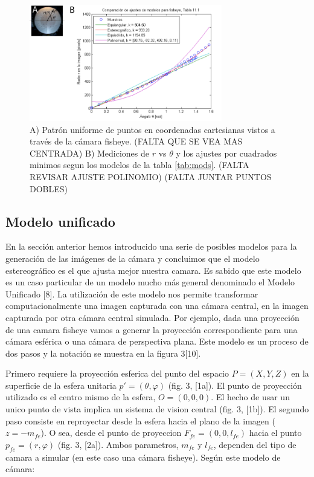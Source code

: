 \documentclass[12pt,a4paper]{article}
\begin{document}
\begin{figure}[!h]
  \centering
  \includegraphics[width=0.75\textwidth]{ajuste.png}
  \caption{A) Patrón uniforme de puntos en coordenadas cartesianas vistos a través de la cámara fisheye. (FALTA QUE SE VEA MAS CENTRADA) B) Mediciones de $r$ vs $\theta$ y los ajustes por cuadrados minimos segun los modelos  de la tabla \ref{tab:mods}. (FALTA REVISAR AJUSTE POLINOMIO) (FALTA JUNTAR PUNTOS DOBLES)}
  \label{fig:ajuste}
\end{figure}


\subsection{Modelo unificado}

En la sección anterior hemos introducido una serie de posibles modelos para la generación de las imágenes de la  cámara y concluimos que el modelo estereográfico es el que ajusta mejor nuestra camara. Es sabido que este modelo es un caso particular de un modelo mucho más general denominado el Modelo Unificado [8]. La utilización de este modelo nos permite transformar computacionalmente una imagen capturada con una cámara central, en la imagen capturada por otra cámara central simulada. Por ejemplo, dada una proyección de una camara fisheye vamos a generar la proyección correspondiente para una cámara esférica o una cámara de perspectiva plana. Este modelo es un proceso de dos pasos y la notación se muestra en la figura 3[10].

Primero requiere la proyección esferica del punto del espacio $P = (X,Y,Z)$ en la superficie de la esfera unitaria $p' = (\theta,\varphi)$ (fig. 3, [1a]). El punto de proyección utilizado es el centro mismo de la esfera, $O = (0,0,0)$. El hecho de usar un unico punto de vista implica un sistema de vision central (fig. 3, [1b]).
El segundo paso consiste en reproyectar desde la esfera hacia el plano de la imagen ($z = -m_{fe}$). O sea, desde el punto de proyeccion $F_{fe} = (0,0,l_{fe})$ hacia el punto $p_{fe} =(r,\varphi)$ (fig. 3, [2a]). Ambos parametros, $m_{fe}$ y $l_{fe}$, dependen del tipo de camara a simular (en este caso una cámara fisheye). Según este modelo de cámara:
\end{document}

